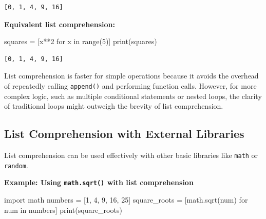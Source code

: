 \documentclass[
  letterpaper,
  DIV=11,
  numbers=noendperiod]{scrreprt}
\newenvironment{Shaded}{\begin{snugshade}}{\end{snugshade}}
\newcommand{\BuiltInTok}[1]{\textcolor[rgb]{0.00,0.23,0.31}{#1}}
\newcommand{\ControlFlowTok}[1]{\textcolor[rgb]{0.00,0.23,0.31}{#1}}
\newcommand{\DecValTok}[1]{\textcolor[rgb]{0.68,0.00,0.00}{#1}}
\newcommand{\ImportTok}[1]{\textcolor[rgb]{0.00,0.46,0.62}{#1}}
\newcommand{\KeywordTok}[1]{\textcolor[rgb]{0.00,0.23,0.31}{#1}}
\newcommand{\NormalTok}[1]{\textcolor[rgb]{0.00,0.23,0.31}{#1}}
\newcommand{\OperatorTok}[1]{\textcolor[rgb]{0.37,0.37,0.37}{#1}}
\begin{document}
\begin{verbatim}
[0, 1, 4, 9, 16]
\end{verbatim}

\textbf{Equivalent list comprehension:}

\begin{Shaded}
\begin{Highlighting}[]
\NormalTok{squares }\OperatorTok{=}\NormalTok{ [x}\OperatorTok{**}\DecValTok{2} \ControlFlowTok{for}\NormalTok{ x }\KeywordTok{in} \BuiltInTok{range}\NormalTok{(}\DecValTok{5}\NormalTok{)]}
\BuiltInTok{print}\NormalTok{(squares)  }
\end{Highlighting}
\end{Shaded}

\begin{verbatim}
[0, 1, 4, 9, 16]
\end{verbatim}

List comprehension is faster for simple operations because it avoids the
overhead of repeatedly calling \texttt{append()} and performing function
calls. However, for more complex logic, such as multiple conditional
statements or nested loops, the clarity of traditional loops might
outweigh the brevity of list comprehension.

\hypertarget{list-comprehension-with-external-libraries}{%
\subsection{List Comprehension with External
Libraries}\label{list-comprehension-with-external-libraries}}

List comprehension can be used effectively with other basic libraries
like \texttt{math} or \texttt{random}.

\textbf{Example: Using \texttt{math.sqrt()} with list comprehension}

\begin{Shaded}
\begin{Highlighting}[]
\ImportTok{import}\NormalTok{ math}
\NormalTok{numbers }\OperatorTok{=}\NormalTok{ [}\DecValTok{1}\NormalTok{, }\DecValTok{4}\NormalTok{, }\DecValTok{9}\NormalTok{, }\DecValTok{16}\NormalTok{, }\DecValTok{25}\NormalTok{]}
\NormalTok{square\_roots }\OperatorTok{=}\NormalTok{ [math.sqrt(num) }\ControlFlowTok{for}\NormalTok{ num }\KeywordTok{in}\NormalTok{ numbers]}
\BuiltInTok{print}\NormalTok{(square\_roots)  }
\end{Highlighting}
\end{Shaded}
\end{document}
